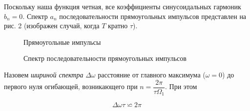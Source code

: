 	Поскольку наша функция четная, все коэффициенты синусоидальных гармоник $b_{n}=0$. Спектр $a_{n}$ последовательности прямоугольных импульсов представлен на рис. 2 (изображен случай, когда $T$ кратно $\tau$).
		
		
		\begin{figure}[h]
			\begin{minipage}[h]{0.5\linewidth}
				\caption{Прямоугольные импульсы}
			\end{minipage}
			\begin{minipage}[h]{0.5\linewidth}
				\caption{Спектр последовательности прямоугольных импульсов}
			\end{minipage}
		\end{figure}
	
	Назовем \textit{шириной спектра} $\Delta \omega$ расстояние от главного максимума ($\omega =0$) до первого нуля огибающей, возникающего при $n=\dfrac{2\pi}{\tau \Omega_{1}}$. При этом 

	$$\Delta \omega \tau \backsimeq 2 \pi $$
	
